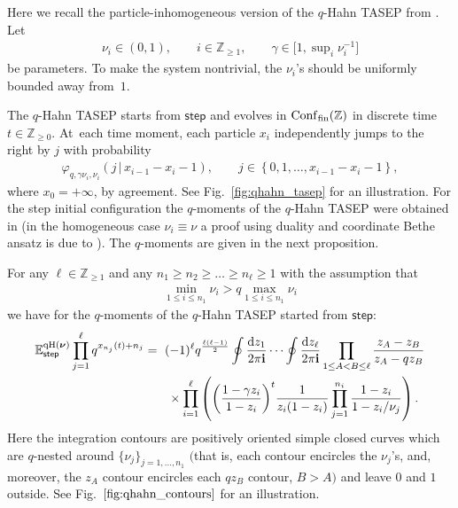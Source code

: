 Here we recall the particle-inhomogeneous version of
the $q$-Hahn TASEP from \cite[Section 6.6]{BorodinPetrov2016inhom}.
Let
\begin{gather*}
	\nu_i\in(0,1),\qquad i\in \mathbb{Z}_{\ge1},\qquad
	\gamma\in\bigl[1,\sup\nolimits_{i}\nu_i^{-1}\bigr]
\end{gather*}
be parameters.
To make the system nontrivial, the $\nu_i$'s should be uniformly
bounded away from~$1$.


The $q$-Hahn TASEP starts from $\mathsf{step}$ and
evolves in
$\mathrm{Conf}_{\rm fin}(\mathbb{Z})$
in discrete time $t\in \mathbb{Z}_{\ge0}$.
At~each time moment, each particle $x_i$ independently
jumps to the right by $j$ with probability
\begin{gather}
	\label{eq:qhahn_one_step_jump}
	\varphi_{q,\gamma\nu_i,\nu_i}(j\,|\, x_{i-1}-x_i-1),
	\qquad
	j\in \left\{ 0,1,\ldots,x_{i-1}-x_i-1 \right\},
\end{gather}
where $x_0=+\infty$, by agreement.
See Fig.~\ref{fig:qhahn_tasep} for an illustration.
For the step initial configuration
the $q$-moments of the $q$-Hahn TASEP were
obtained in \cite[Corollary 10.4]{BorodinPetrov2016inhom}
(in the homogeneous case $\nu_i\equiv \nu$
a proof using duality and coordinate
Bethe ansatz
is due to
\cite{Corwin2014qmunu}). The $q$-moments are given in the next proposition.
\begin{Proposition}
	For any $\ell\in \mathbb{Z}_{\ge1}$
	and any $n_1\ge n_2\ge \dots\ge n_\ell\ge1$
	with the assumption that
	\begin{gather}
		\label{eq:qhahn_nu_contour_existence_assumption}
		\min_{1\le i\le n_1}
		\nu_i>q \max_{1\le i\le n_1} \nu_i
	\end{gather}
	we have for the $q$-moments of the $q$-Hahn TASEP started from $\mathsf{step}$:
	\begin{gather}
\mathbb{E}^{\mathrm{qH}(\boldsymbol\nu)}_{\mathsf{step}}
\prod_{j=1}^{\ell}q^{x_{n_j}(t)+n_j}= 
			(-1)^{\ell}q^{\frac{\ell(\ell-1)}{2}}
			\oint\frac{{\rm d}z_1}{2\pi\mathbf{i}}
			\cdots
			\oint\frac{{\rm d}z_\ell}{2\pi\mathbf{i}}
			\prod_{1\le A<B\le \ell}\frac{z_A-z_B}{z_A-qz_B}\nonumber
\\ \hphantom{\mathbb{E}^{\mathrm{qH}(\boldsymbol\nu)}_{\mathsf{step}}
\prod_{j=1}^{\ell}q^{x_{n_j}(t)+n_j}= }
{}\times\prod_{i=1}^{\ell}\left(\bigg( \frac{1-\gamma z_i}{1-z_i} \bigg)^t
\frac{1}{z_i(1-z_i)}\prod_{j=1}^{n_i}\frac{1-z_i}{1-z_i/\nu_j} \right).
\label{eq:qhahn_step_moments}
\end{gather}
	Here the integration contours are positively oriented simple
	closed curves which are
	$q$-nested around $\{\nu_j\}_{j=1,\ldots,n_1 }$
	$($that is, each contour encircles the $\nu_j$'s, and, moreover, the $z_A$ contour
	encircles each $qz_B$ contour, $B>A)$
	and leave $0$ and $1$ outside. See
	Fig.~$\ref{fig:qhahn_contours}$ for an illustration.
\end{Proposition}

